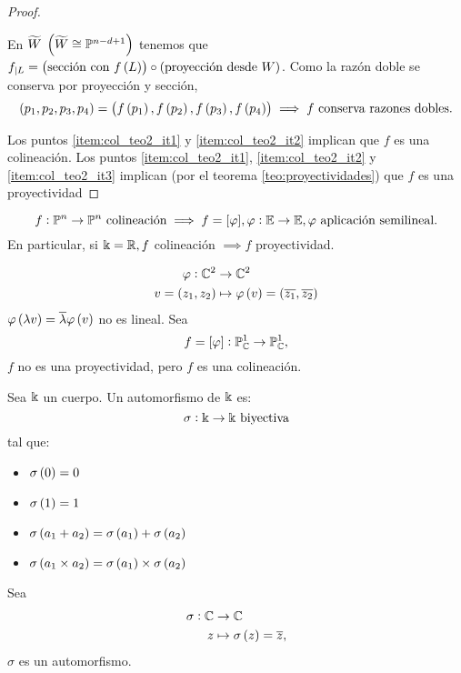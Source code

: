 \begin{proof}
\begin{enumerate}[(1)]
        En $\widetilde{W} \; \left( \widetilde{W}\cong\mathbb{P}^{n-d+1} \right)$ tenemos que $f_{|L} = \left( \text{sección con }f \left( L \right) \right) \circ \left( \text{proyección desde } W \right)$. Como la razón doble se conserva por proyección y sección,
        \[ \left( p_1, p_2, p_3, p_4 \right) = \left( f \left( p_1 \right), f \left( p_2 \right), f \left( p_3 \right), f \left( p_4 \right) \right) \implies f \text{ conserva razones dobles.}
        \]
    \end{enumerate}
    \noindent Los puntos \eqref{item:col_teo2_it1} y \eqref{item:col_teo2_it2} implican que $f$ es una colineación. Los puntos \eqref{item:col_teo2_it1}, \eqref{item:col_teo2_it2} y \eqref{item:col_teo2_it3} implican (por el teorema \ref{teo:proyectividades}) que $f$ es una proyectividad
\end{proof}
\begin{teo}
    \[ f : \mathbb{P}^n \to \mathbb{P}^n \text{ colineación} \implies f = [\varphi], \varphi : \mathbb{E} \to \mathbb{E}, \varphi \text{ aplicación semilineal}. \]
    En particular, si $\Bbbk = \mathbb{R}, f$ colineación $\implies f$ proyectividad.
\end{teo}
\begin{example}
    \begin{align*}
        \varphi : \mathbb{C}^2 &\to \mathbb{C}^2 \\
        v = \left( z_1, z_2 \right) &\mapsto \varphi \left( v \right) = \left( \overline{z_1}, \overline{z_2} \right)
    \end{align*}
    $\varphi \left( \lambda v \right) = \overline{\lambda} \varphi \left( v \right)$ no es lineal. Sea 
    \[ f = [\varphi] : \mathbb{P}^1_{\mathbb{C}} \to \mathbb{P}^1_{\mathbb{C}}, \]
    $f$ no es una proyectividad, pero $f$ es una colineación.
\end{example}
\begin{defi}
    Sea $\Bbbk$ un cuerpo. Un automorfismo de $\Bbbk$ es:
    \[ \sigma : \Bbbk \to \Bbbk \text{ biyectiva} \]
    tal que:
    \begin{itemize}
        \item $\sigma \left( 0 \right) = 0$
        \item $\sigma \left( 1 \right) = 1$
        \item $\sigma \left( a_1 + a_2 \right) = \sigma \left( a_1 \right) + \sigma \left( a_2 \right)$
        \item $\sigma \left( a_1 \times a_2 \right) = \sigma \left( a_1 \right) \times \sigma \left( a_2 \right)$
    \end{itemize}
\end{defi}
\begin{example}
    Sea
    \begin{align*}
        \sigma : \mathbb{C} &\to \mathbb{C} \\
        z &\mapsto \sigma \left( z \right) = \overline{z},
    \end{align*}
    $\sigma$ es un automorfismo.
\end{example}
